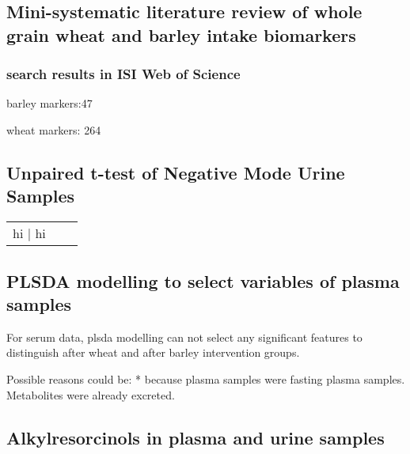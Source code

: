 \subsection{Mini-systematic literature review of whole grain wheat and barley intake biomarkers}
\subsubsection{search results in ISI Web of Science}

barley markers:47

wheat markers: 264

\subsection{Unpaired t-test of Negative Mode Urine Samples}
\begin{tabular}{c|c|c}
	hi | hi
\end{tabular}

\subsection{PLSDA modelling to select variables of plasma samples}
For serum data, plsda modelling can not select any significant features to distinguish after wheat and after barley intervention groups.

Possible reasons could be:
* because plasma samples were fasting plasma samples. Metabolites were already excreted.

\subsection{Alkylresorcinols in plasma and urine samples}